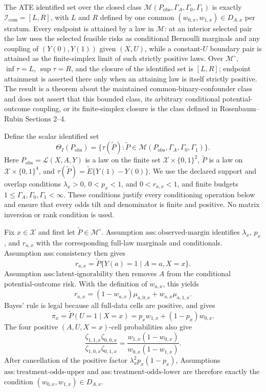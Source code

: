 The ATE identified set over the closed class \(\mathcal M(P_{\mathrm{obs}},\Gamma_A,\Gamma_0,\Gamma_1)\) is exactly \(\mathcal I_{\mathrm{com}}=[L,R]\), with \(L\) and \(R\) defined by one common \((w_{0,x},w_{1,x})\in D_{A,x}\) per stratum.  Every endpoint is attained by a law in \(\mathcal M\): at an interior selected pair the law uses the selected feasible risks as conditional Bernoulli marginals and any coupling of \((Y(0),Y(1))\) given \((X,U)\), while a constant-\(U\) boundary pair is attained as the finite-simplex limit of such strictly positive laws.  Over \(\mathcal M^{\circ}\), \(\inf\tau=L\), \(\sup\tau=R\), and the closure of the identified set is \([L,R]\); endpoint attainment is asserted there only when an attaining law is itself strictly positive.  The result is a theorem about the maintained common-binary-confounder class and does not assert that this bounded class, its arbitrary conditional potential-outcome coupling, or its finite-simplex closure is the class defined in Rosenbaum--Rubin Sections 2--4.

Define the scalar identified set
\[
 \Theta_I(P_{\mathrm{obs}})
 =\{\tau(\widetilde P):
       \widetilde P\in
       \mathcal M(P_{\mathrm{obs}},\Gamma_A,\Gamma_0,\Gamma_1)\}.
 \tag{33}
\]
Here \(P_{\mathrm{obs}}=\mathcal L(X,A,Y)\) is a law on the finite set \(\mathcal X\times\{0,1\}^2\), \(\widetilde P\) is a law on \(\mathcal X\times\{0,1\}^4\), and \(\tau(\widetilde P)=\widetilde E\{Y(1)-Y(0)\}\).  We use the declared support and overlap conditions \(\lambda_x>0\), \(0<p_x<1\), and \(0<r_{a,x}<1\), and finite budgets \(1\leq\Gamma_A,\Gamma_0,\Gamma_1<\infty\).  These conditions justify every conditioning operation below and ensure that every odds tilt and denominator is finite and positive.  No matrix inversion or rank condition is used.

Fix \(x\in\mathcal X\) and first let \(\widetilde P\in\mathcal M^{\circ}\).  Assumption \(\mathrm{ass{:}observed\text{-}margin}\) identifies \(\lambda_x\), \(p_x\), and \(r_{a,x}\) with the corresponding full-law marginals and conditionals.  Assumption \(\mathrm{ass{:}consistency}\) then gives
\[
 r_{a,x}=\widetilde P\{Y(a)=1\mid A=a,X=x\}.
\]
Assumption \(\mathrm{ass{:}latent\text{-}ignorability}\) then removes \(A\) from the conditional potential-outcome risk.  With the definition of \(w_{a,x}\), this yields
\[
 r_{a,x}=(1-w_{a,x})\mu_{a,0,x}+w_{a,x}\mu_{a,1,x}.
 \tag{34}
\]
Bayes' rule is legal because all full-data cells are positive, and gives
\[
 \pi_x=\widetilde P(U=1\mid X=x)
      =p_xw_{1,x}+(1-p_x)w_{0,x}.
 \tag{35}
\]
The four positive \((A,U,X=x)\)-cell probabilities also give
\[
 \frac{\zeta_{1,1,x}\zeta_{0,0,x}}
      {\zeta_{1,0,x}\zeta_{0,1,x}}
 =\frac{w_{1,x}(1-w_{0,x})}
       {w_{0,x}(1-w_{1,x})}.
 \tag{36}
\]
After cancellation of the positive factor \(\lambda_x^2p_x(1-p_x)\), Assumptions \(\mathrm{ass{:}treatment\text{-}odds\text{-}upper}\) and \(\mathrm{ass{:}treatment\text{-}odds\text{-}lower}\) are therefore exactly the condition \((w_{0,x},w_{1,x})\in D_{A,x}\).

